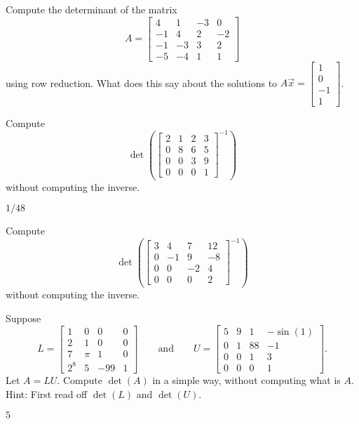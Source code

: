 \begin{exercise}\ansMark%
Compute the determinant of the matrix
\[ A = \begin{bmatrix}
4  & 1 & -3 &  0\\
-1 &  4 &  2 & -2\\
-1 & -3 & 3 & 2\\
-5 & -4 & 1 & 1
\end{bmatrix}
\]
using row reduction. What does this say about the solutions to $A\vec{x} = \left[ \begin{smallmatrix} 1 \\ 0 \\ -1 \\ 1 \end{smallmatrix} \right]$.
\end{exercise}

\begin{exercise}
Compute
\begin{equation*}
\det \left( \begin{bmatrix}
2 & 1 & 2 & 3 \\
0 & 8 & 6 & 5 \\
0 & 0 & 3 & 9 \\
0 & 0 & 0 & 1
\end{bmatrix}^{-1}
\right)
\end{equation*}
without computing the inverse.
\end{exercise}
\comboSol{%
}
{%
$1/48$
}

\begin{exercise}\ansMark%
Compute
\begin{equation*}
\det \left( \begin{bmatrix}
3 & 4 & 7 & 12 \\
0 & -1 & 9 & -8 \\
0 & 0 & -2 & 4 \\
0 & 0 & 0 & 2
\end{bmatrix}^{-1}
\right)
\end{equation*}
without computing the inverse.
\end{exercise}

\begin{exercise}
Suppose
\begin{equation*}
L = \begin{bmatrix}
1 & 0 & 0 & 0 \\
2 & 1 & 0 & 0 \\
7 & \pi & 1 & 0 \\
2^8 & 5 & -99 & 1
\end{bmatrix}
\qquad \text{and} \qquad
U = \begin{bmatrix}
5 & 9 & 1 & -\sin(1) \\
0 & 1 & 88 & -1 \\
0 & 0 & 1 & 3 \\
0 & 0 & 0 & 1
\end{bmatrix} .
\end{equation*}
Let $A = LU$.  Compute $\det(A)$ in a simple way, without computing what is $A$.
Hint: First read off $\det(L)$ and $\det(U)$.
\end{exercise}
\comboSol{%
}
{%
$5$
}

